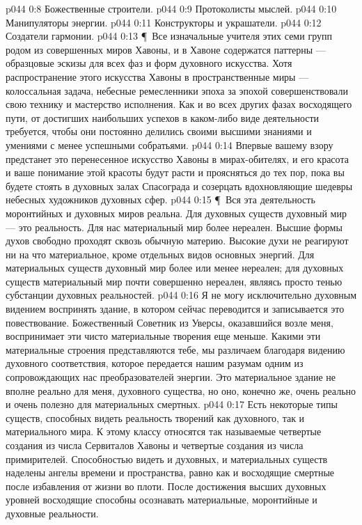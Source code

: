 \vs p044 0:8 \bibnobreakspace Божественные строители.
\vs p044 0:9 \bibnobreakspace Протоколисты мыслей.
\vs p044 0:10 \bibnobreakspace Манипуляторы энергии.
\vs p044 0:11 \bibnobreakspace Конструкторы и украшатели.
\vs p044 0:12 \bibnobreakspace Создатели гармонии.
\vs p044 0:13 \P\ Все изначальные учителя этих семи групп родом из совершенных миров Хавоны, и в Хавоне содержатся паттерны --- образцовые эскизы для всех фаз и форм духовного искусства. Хотя распространение этого искусства Хавоны в пространственные миры --- колоссальная задача, небесные ремесленники эпоха за эпохой совершенствовали свою технику и мастерство исполнения. Как и во всех других фазах восходящего пути, от достигших наибольших успехов в каком\hyp{}либо виде деятельности требуется, чтобы они постоянно делились своими высшими знаниями и умениями с менее успешными собратьями.
\vs p044 0:14 Впервые вашему взору предстанет это перенесенное искусство Хавоны в мирах\hyp{}обителях, и его красота и ваше понимание этой красоты будут расти и проясняться до тех пор, пока вы будете стоять в духовных залах Спасограда и созерцать вдохновляющие шедевры небесных художников духовных сфер.
\vs p044 0:15 \P\ Вся эта деятельность моронтийных и духовных миров реальна. Для духовных существ духовный мир --- это реальность. Для нас материальный мир более нереален. Высшие формы духов свободно проходят сквозь обычную материю. Высокие духи не реагируют ни на что материальное, кроме отдельных видов основных энергий. Для материальных существ духовный мир более или менее нереален; для духовных существ материальный мир почти совершенно нереален, являясь просто тенью субстанции духовных реальностей.
\vs p044 0:16 Я не могу исключительно духовным видением воспринять здание, в котором сейчас переводится и записывается это повествование. Божественный Советник из Уверсы, оказавшийся возле меня, воспринимает эти чисто материальные творения еще меньше. Какими эти материальные строения представляются тебе, мы различаем благодаря видению духовного соответствия, которое передается нашим разумам одним из сопровождающих нас преобразователей энергии. Это материальное здание не вполне реально для меня, духовного существа, но оно, конечно же, очень реально и очень полезно для материальных смертных.
\vs p044 0:17 Есть некоторые типы существ, способных видеть реальность творений как духовного, так и материального мира. К этому классу относятся так называемые четвертые создания из числа Сервиталов Хавоны и четвертые создания из числа примирителей. Способностью видеть и духовных, и материальных существ наделены ангелы времени и пространства, равно как и восходящие смертные после избавления от жизни во плоти. После достижения высших духовных уровней восходящие способны осознавать материальные, моронтийные и духовные реальности.
